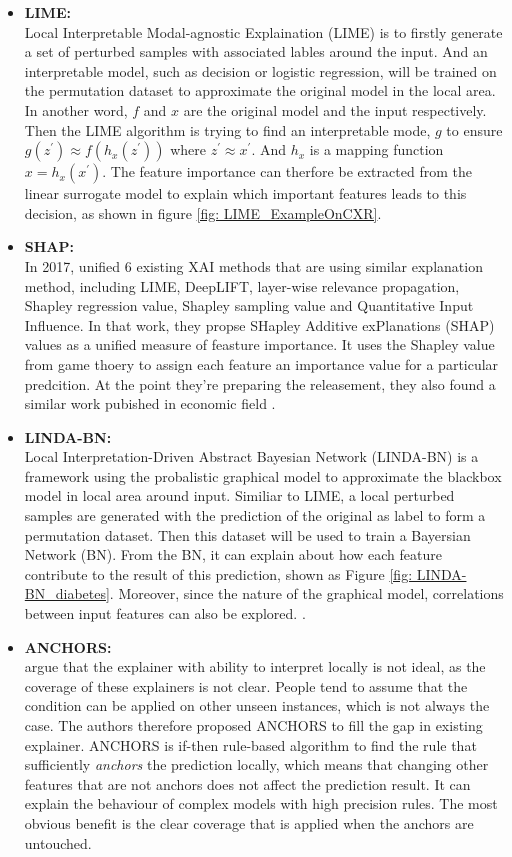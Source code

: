 \begin{itemize}
    \item \textbf{LIME:} \\ Local Interpretable Modal-agnostic Explaination (LIME) is to firstly generate a set of perturbed samples with associated lables around the input. And an interpretable model, such as decision or logistic regression, will be trained on the permutation dataset to approximate the original model in the local area. In another word, $f$ and $x$ are the original model and the input respectively. Then the LIME algorithm is trying to find an interpretable mode, $g$ to ensure $g(z^{'}) \approx f(h_{x}(z^{'}))$ where $z^{'} \approx x^{'}$. And $h_{x}$ is a mapping function $x = h_{x}(x^{'})$. The feature importance can therfore be extracted from the linear surrogate model to explain which important features leads to this decision, as shown in figure \ref{fig: LIME_ExampleOnCXR}.\\
    \item \textbf{SHAP:} \\ In 2017, \citet{Lundberg2017SHAP} unified 6 existing XAI methods that are using similar explanation method, including LIME, DeepLIFT, layer-wise relevance propagation, Shapley regression value, Shapley sampling value and Quantitative Input Influence. In that work, they propse SHapley Additive exPlanations (SHAP) values as a unified measure of feasture importance. It uses the Shapley value from game thoery to assign each feature an importance value for a particular predcition. At the point they're preparing the releasement, they also found a similar work pubished in economic field \citep{Charnes1988ShapeleyValueInEconomic}. \\
    \item \textbf{LINDA-BN:} \\ Local Interpretation-Driven Abstract Bayesian Network (LINDA-BN) is a framework using the probalistic graphical model to approximate the blackbox model in local area around input. Similiar to LIME, a local perturbed samples are generated with the prediction of the original as label to form a permutation dataset. Then this dataset will be used to train a Bayersian Network (BN). From the BN, it can explain about how each feature contribute to the result of this prediction, shown as Figure \ref{fig: LINDA-BN_diabetes}. Moreover, since the nature of the graphical model, correlations between input features can also be explored.  \citep{Moreira2021LINDA}.
    \item \textbf{ANCHORS:} \\ \citet{Ribeiro2018Anchors} argue that the explainer with ability to interpret locally is not ideal, as the coverage of these explainers is not clear. People tend to assume that the condition can be applied on other unseen instances, which is not always the case. The authors therefore proposed ANCHORS to fill the gap in existing explainer. ANCHORS is if-then rule-based algorithm to find the rule that sufficiently \textit{anchors} the prediction locally, which means that changing other features that are not anchors does not affect the prediction result. It can explain the behaviour of complex models with high precision rules. The most obvious benefit is the clear coverage that is applied when the anchors are untouched.

\end{itemize}
